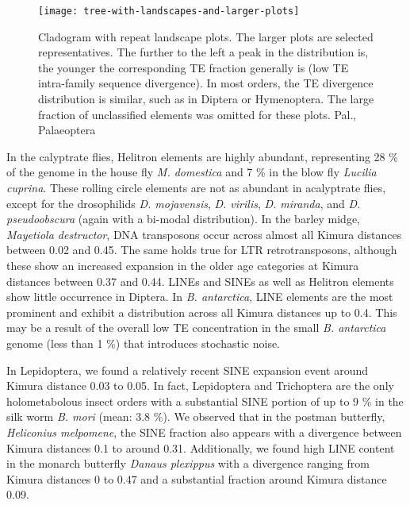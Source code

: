 \begin{figure}[h!]
\begin{center}
\texttt{[image: tree-with-landscapes-and-larger-plots]}
\caption[Arthropod repeat landscapes]{{Cladogram with repeat landscape plots. The larger plots are selected
representatives. The further to the left a peak in the distribution is,
the younger the corresponding TE fraction generally is (low TE
intra-family sequence divergence). In most orders, the TE divergence
distribution is similar, such as in Diptera or Hymenoptera. The large
fraction of unclassified elements was omitted for these plots. Pal.,
Palaeoptera%
\label{fig:landscapes}
}}
\end{center}
\end{figure}


In the calyptrate flies, Helitron elements are highly abundant,
representing 28 \% of the genome in the house fly \emph{M. domestica}
and 7 \% in the blow fly \emph{Lucilia cuprina}. These rolling circle
elements are not as abundant in acalyptrate flies, except for the
drosophilids \emph{D. mojavensis}, \emph{D. virilis}, \emph{D. miranda},
and \emph{D. pseudoobscura} (again with a bi-modal distribution). In the
barley midge, \emph{Mayetiola destructor}, DNA transposons occur across
almost all Kimura distances between 0.02 and 0.45. The same holds true
for LTR retrotransposons, although these show an increased expansion in
the older age categories at Kimura distances between 0.37 and 0.44.
LINEs and SINEs as well as Helitron elements show little occurrence in
Diptera. In \emph{B. antarctica}, LINE elements are the most prominent
and exhibit a distribution across all Kimura distances up to 0.4. This
may be a result of the overall low TE concentration in the small
\emph{B. antarctica} genome (less than 1 \%) that introduces stochastic
noise.

In Lepidoptera, we found a relatively recent SINE expansion event around
Kimura distance 0.03 to 0.05. In fact, Lepidoptera and Trichoptera are
the only holometabolous insect orders with a substantial SINE portion of
up to 9 \% in the silk worm \emph{B. mori} (mean: 3.8 \%). We observed
that in the postman butterfly, \emph{Heliconius melpomene}, the SINE
fraction also appears with a divergence between Kimura distances 0.1 to
around 0.31. Additionally, we found high LINE content in the monarch
butterfly \emph{Danaus plexippus} with a divergence ranging from Kimura
distances 0 to 0.47 and a substantial fraction around Kimura distance
0.09.

